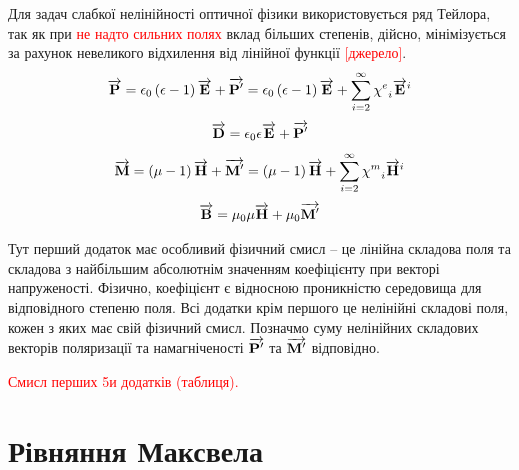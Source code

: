 Для задач слабкої нелінійності оптичної фізики використовується ряд Тейлора, 
так як при \textcolor{red}{не надто сильних полях} вклад більших степенів,
дійсно, мінімізується за рахунок невеликого відхилення від лінійної
функції \textcolor{red}{[джерело]}.
%
\begin{equation} \label{eq:polar}
\overrightarrow{\mathbf P} = \epsilon_0 \left( \epsilon - 1 \right) \overrightarrow{\mathbf E} + 
\overrightarrow{\mathbf P^\prime}  = \epsilon_0 \left( \epsilon - 1 \right)
\overrightarrow{\mathbf E} + \sum\limits_{i=2}^\infty  {\chi^e}_i \overrightarrow{\mathbf E}^i 
\end{equation}
%
\textcolor{lightgray}{ \begin{equation*} \begin{aligned}
\overrightarrow{\mathbf D} = \epsilon_0 \epsilon \overrightarrow{\mathbf E} + \overrightarrow{\mathbf P^\prime}
\end{aligned} \end{equation*} }
%
\begin{equation} \label{eq:magnit}
\overrightarrow{\mathbf M} = \left( \mu - 1 \right) \overrightarrow{\mathbf H} + 
\overrightarrow{\mathbf M^\prime} = \left( \mu - 1 \right)
\overrightarrow{\mathbf H} + \sum\limits_{i=2}^\infty  {\chi^m}_i \overrightarrow{\mathbf H}^i 
\end{equation}
%
\textcolor{lightgray}{ \begin{equation*} \begin{aligned}
\overrightarrow{\mathbf B} = \mu_0 \mu  \overrightarrow{\mathbf H} + \mu_0 \overrightarrow{\mathbf M^\prime}
\end{aligned} \end{equation*} }

Тут перший додаток має особливий фізичний смисл -- це лінійна складова поля та 
складова з найбільшим абсолютнім значенням коефіцієнту при векторі 
напруженості. Фізично, коефіцієнт є відносною проникністю середовища для 
відповідного степеню поля. Всі додатки крім першого це нелінійні складові поля,
кожен з яких має свій фізичний смисл.  Позначмо суму нелінійних складових 
векторів поляризації та намагніченості $ \overrightarrow{\mathbf P^\prime} $ та 
$ \overrightarrow{\mathbf M^\prime} $ відповідно.

\textcolor{red}{Смисл перших 5и додатків (таблиця).}

\section{Рівняння Максвела}


